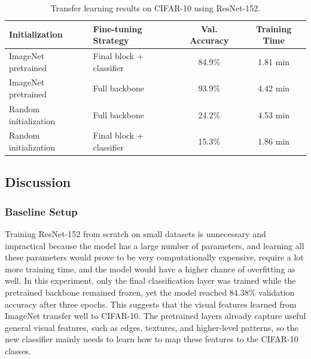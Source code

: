 \documentclass{article}
\begin{document}
\begin{table}[H]
\centering
\caption{Transfer learning results on CIFAR-10 using ResNet-152.}
\label{tab:transfer_results}
\begin{tabular}{l l c c}
\hline
\textbf{Initialization} & \textbf{Fine-tuning Strategy} & \textbf{Val. Accuracy} & \textbf{Training Time} \\
\hline
ImageNet pretrained & Final block + classifier & 84.9\% & 1.81 min \\
ImageNet pretrained & Full backbone & 93.9\% & 4.42 min \\
Random initialization & Full backbone & 24.2\% & 4.53 min \\
Random initialization & Final block + classifier & 15.3\% & 1.86 min \\
\hline
\end{tabular}
\end{table}

\subsection{Discussion}
\subsubsection{Baseline Setup}
Training ResNet-152 from scratch on small datasets is unnecessary and impractical because the model has a large number of parameters, and learning all these parameters would prove to be very computationally expensive, require a lot more training time, and the model would have a higher chance of overfitting as well. In this experiment, only the final classification layer was trained while the pretrained backbone remained frozen, yet the model reached 84.38\% validation accuracy after three epochs. This suggests that the visual features learned from ImageNet transfer well to CIFAR-10. The pretrained layers already capture useful general visual features, such as edges, textures, and higher-level patterns, so the new classifier mainly needs to learn how to map these features to the CIFAR-10 classes.
\end{document}
